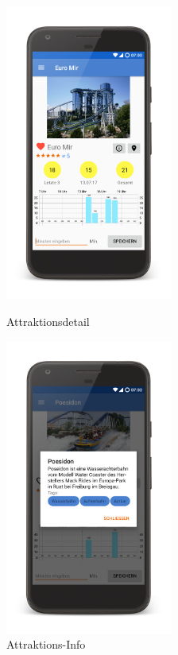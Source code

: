 \begin{figure}[h]
    \centering
    \begin{minipage}{0.49\textwidth}
        \centering
        \includegraphics[width=0.49\textwidth, trim=150 200 200 200, 
        clip]{img/screenshots/ss_attraktionsdetail.png}
        \caption{Attraktionsdetail}
		\label{figure:implementierungattraktionsansicht}
    \end{minipage}
    \begin{minipage}{0.49\textwidth}
    	\centering
    	\includegraphics[width=0.49\textwidth, trim=150 200 200 200, 
    	clip]{img/screenshots/ss_attraktion_info.png}
    	\caption{Attraktions-Info}
    	\label{figure:implementierungattraktionsinfo}
    \end{minipage}
\end{figure}

